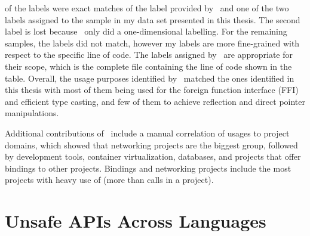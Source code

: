 

 of the labels were exact matches of the label provided by~\cite{costa2020} and one of the two labels
assigned to the sample in my data set presented in this thesis.
The second label is lost because~\cite{costa2020} only did a one-dimensional labelling.
For the remaining  samples, the labels did not match, however my labels are more fine-grained with respect
to the specific line of code.
The labels assigned by~\cite{costa2020} are appropriate for their scope, which is the complete file containing the line
of code shown in the table.
Overall, the usage purposes identified by~\cite{costa2020} matched the ones identified in this thesis with most of them
being used for the foreign function interface (\acrshort{FFI}) and efficient type casting, and few of them to achieve
reflection and direct pointer manipulations.

Additional contributions of~\cite{costa2020} include a manual correlation of \unsafe{} usages to project domains, which
showed that networking projects are the biggest group, followed by development tools, container virtualization,
databases, and projects that offer bindings to other projects.
Bindings and networking projects include the most projects with heavy use of \unsafe{} (more than  calls
in a project).



\section{Unsafe APIs Across Languages}\label{sec:related-work:unsafe-across-languages}

